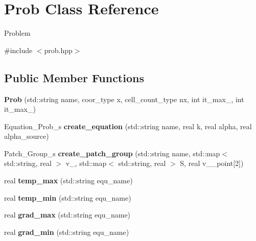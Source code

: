 \hypertarget{classProb}{
\section{Prob Class Reference}
\label{classProb}
}


Problem  


{\ttfamily \#include $<$prob.hpp$>$}\subsection*{Public Member Functions}
\begin{DoxyCompactItemize}
\item 
\hypertarget{classProb_a4d146873812b11594835eeb221057ce3}{
{\bfseries Prob} (std::string name, coor\_\-type x, cell\_\-count\_\-type nx, int it\_\-max\_, int it\_\-max\_)}
\label{classProb_a4d146873812b11594835eeb221057ce3}

\item 
\hypertarget{classProb_a9e42af858cc616a84ffa860ed30703cc}{
Equation\_\-Prob\_\-s {\bfseries create\_\-equation} (std::string name, real k, real alpha, real alpha\_\-source)}
\label{classProb_a9e42af858cc616a84ffa860ed30703cc}

\item 
\hypertarget{classProb_aca3ea6040c622c41e0cae18360b44969}{
Patch\_\-Group\_\-s {\bfseries create\_\-patch\_\-group} (std::string name, std::map$<$ std::string, real $>$ v\_, std::map$<$ std::string, real $>$ S, real v\_\_\-point\mbox{[}2\mbox{]})}
\label{classProb_aca3ea6040c622c41e0cae18360b44969}

\item 
\hypertarget{classProb_a70dca1f3332e57f72b834ba91d52ca31}{
real {\bfseries temp\_\-max} (std::string equ\_\-name)}
\label{classProb_a70dca1f3332e57f72b834ba91d52ca31}

\item 
\hypertarget{classProb_ac1bce1f293f1ec1c251730db1a1d0313}{
real {\bfseries temp\_\-min} (std::string equ\_\-name)}
\label{classProb_ac1bce1f293f1ec1c251730db1a1d0313}

\item 
\hypertarget{classProb_a9fff19c6e6676c72153dc0ed32b1e6a9}{
real {\bfseries grad\_\-max} (std::string equ\_\-name)}
\label{classProb_a9fff19c6e6676c72153dc0ed32b1e6a9}

\item 
\hypertarget{classProb_a6dc764bdb12b430c1a28d73925f6c6d8}{
real {\bfseries grad\_\-min} (std::string equ\_\-name)}
\label{classProb_a6dc764bdb12b430c1a28d73925f6c6d8}


\end{DoxyCompactItemize}
